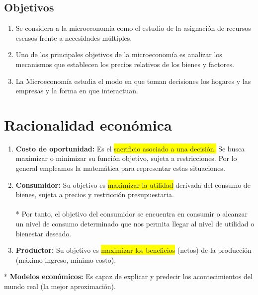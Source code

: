 \documentclass{templateNote}
\newcommand{\destacar}[1]{ \colorbox{yellow}{#1}}
\begin{document}
\subsection{Objetivos}
\begin{enumerate}
    \item Se considera a la microeconomía como el estudio de la asignación
de recursos escasos frente a necesidades múltiples.
    
    \item Uno de los principales objetivos de la microeconomía es analizar
los mecanismos que establecen los precios relativos de los bienes
y factores.
    
    \item La Microeconomía estudia el modo en que toman decisiones los
hogares y las empresas y la forma en que interactuan.
\end{enumerate}

\newpage
\section{Racionalidad económica}
\begin{enumerate}
    \item \textbf{Costo de oportunidad:} Es el \destacar{sacrificio asociado a una decisión.} Se
    busca maximizar o minimizar su función objetivo, sujeta a
    restricciones. Por lo general empleamos la matemática para
    representar estas situaciones.
    
    \item \textbf{Consumidor:} Su objetivo es \destacar{maximizar la utilidad} derivada del consumo de bienes, sujeta a precios y restricción presupuestaria. \\
\\
* Por tanto, el objetivo del consumidor se encuentra en consumir o alcanzar un nivel
de consumo determinado que nos permita llegar al nivel de utilidad
o bienestar deseado. \\

    \item \textbf{Productor:} Su objetivo es \destacar{maximizar los beneficios} (netos) de la producción (máximo ingreso, mínimo costo). \\
\end{enumerate}
* \textbf{Modelos económicos:} Es capaz de explicar y predecir los acontecimientos del mundo real (la mejor aproximación).
\end{document}
